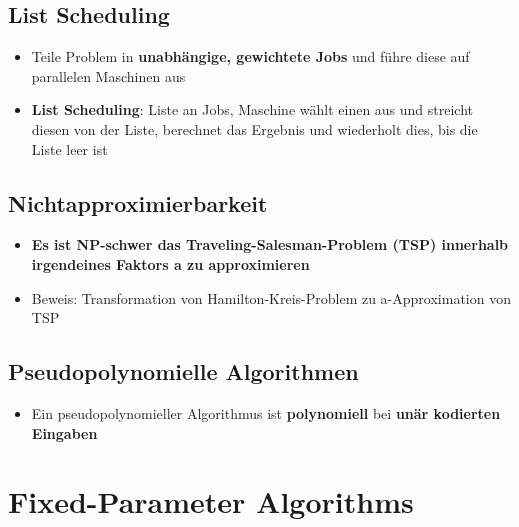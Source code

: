 \documentclass[10pt,a4paper]{article}
\begin{document}
	\subsection{List Scheduling}
	\label{aa:sub:list_scheduling}
	
	\begin{itemize}
		\item Teile Problem in \textbf{unabhängige, gewichtete Jobs} und führe diese auf parallelen Maschinen aus
		\item \textbf{List Scheduling}: Liste an Jobs, Maschine wählt einen aus und streicht diesen von der Liste, berechnet das Ergebnis und wiederholt dies, bis die Liste leer ist
	\end{itemize}

	\subsection{Nichtapproximierbarkeit}
	\label{aa:sub:nichtapproximierbarkeit}
	
	\begin{itemize}
		\item \textbf{Es ist NP-schwer das Traveling-Salesman-Problem (TSP) innerhalb irgendeines Faktors a zu approximieren}
		\item Beweis: Transformation von Hamilton-Kreis-Problem zu a-Approximation von TSP
	\end{itemize}

	\subsection{Pseudopolynomielle Algorithmen}
	\label{aa:sub:pseudopolynomielle_algorithmen}
	
	\begin{itemize}
		\item Ein pseudopolynomieller Algorithmus ist \textbf{polynomiell} bei \textbf{unär kodierten Eingaben}
	\end{itemize}

	\newpage
	\section{Fixed-Parameter Algorithms}
	\label{fpa:sec:fixed_parameter_algorithms}
	
\end{document}
